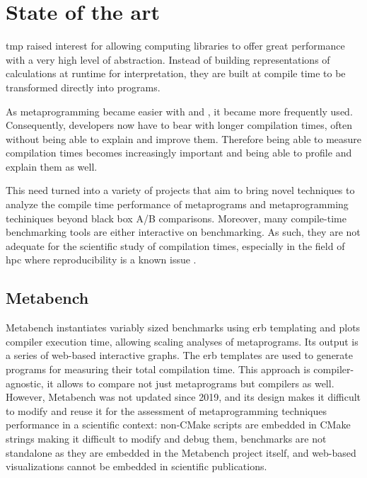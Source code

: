 \documentclass[../main]{subfiles}
\begin{document}
\section{
  State of the art
}

\cpp \gls{tmp} raised interest for allowing computing libraries
to offer great performance with a very high level of abstraction.
Instead of building representations of calculations at runtime for
interpretation, they are built at compile time to be transformed directly into
programs.

As metaprogramming became easier with  and ,
it became more frequently used.
Consequently, developers now have to bear with longer
compilation times, often without being able to explain and improve them.
Therefore being able to measure compilation times becomes increasingly important
and being able to profile and explain them as well.

This need turned into a variety of projects that aim to bring novel techniques
to analyze the compile time performance of \cpp metaprograms and metaprogramming
techiniques beyond black box A/B comparisons. Moreover, many compile-time
benchmarking tools are either interactive on benchmarking. As such, they are not
adequate for the scientific study of compilation times, especially in the field
of \gls{hpc} where reproducibility is a known issue
\cite{antunes2024reproducibility}.

\subsection{
  Metabench
}

Metabench\cite{metabench} instantiates variably sized benchmarks using
\gls{erb} templating and plots compiler execution time, allowing
scaling analyses of metaprograms. Its output is a series of web-based
interactive graphs.
The \gls{erb} templates are used to generate \cpp programs for measuring their
total compilation time. This approach is compiler-agnostic, it allows to compare
not just metaprograms but compilers as well.
\\

However, Metabench was not updated since 2019, and its design makes it
difficult to modify and reuse it for the assessment of metaprogramming
techniques performance in a scientific context:
non-CMake scripts are embedded in CMake strings making it difficult to modify
and debug them, benchmarks are not standalone as they are embedded
in the Metabench project itself, and web-based visualizations cannot be embedded
in scientific publications.
\end{document}
